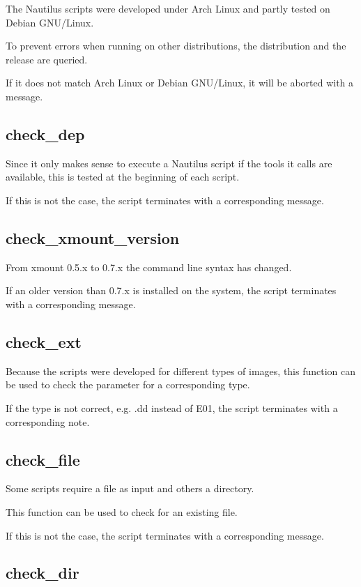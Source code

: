 The Nautilus scripts were developed under Arch Linux and partly tested on Debian GNU/Linux.

To prevent errors when running on other distributions, the distribution and the release are queried.

If it does not match Arch Linux or Debian GNU/Linux, it will be aborted with a message.

\subsection{check\_dep}

Since it only makes sense to execute a Nautilus script if the tools it calls are available, this is tested at the beginning of each script.

If this is not the case, the script terminates with a corresponding message.

\subsection{check\_xmount\_version}

From xmount 0.5.x to 0.7.x the command line syntax has changed.

If an older version than 0.7.x is installed on the system, the script terminates with a corresponding message.

\subsection{check\_ext}

Because the scripts were developed for different types of images, this function can be used to check the parameter for a corresponding type.

If the type is not correct, e.g. .dd instead of E01, the script terminates with a corresponding note.

\subsection{check\_file}

Some scripts require a file as input and others a directory.

This function can be used to check for an existing file.

If this is not the case, the script terminates with a corresponding message.

\subsection{check\_dir}

